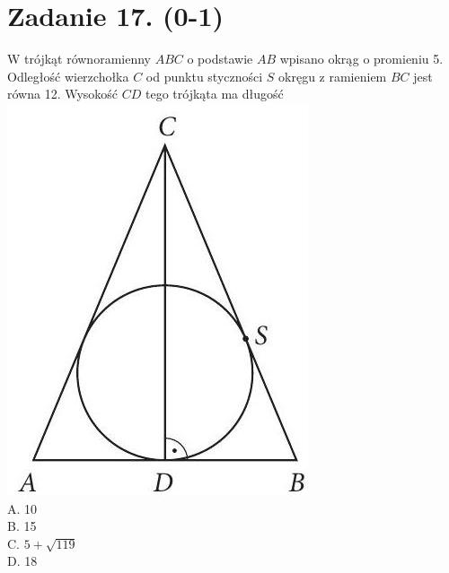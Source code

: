 \documentclass[10pt]{article}
\begin{document}
\section*{Zadanie 17. (0-1)}
W trójkąt równoramienny \(A B C\) o podstawie \(A B\) wpisano okrąg o promieniu 5. Odległość wierzchołka \(C\) od punktu styczności \(S\) okręgu z ramieniem \(B C\) jest równa 12. Wysokość \(C D\) tego trójkąta ma długość\\
\includegraphics[max width=\textwidth, center]{2024_11_21_4a1915d79134dda0750eg-06(1)}\\
A. 10\\
B. 15\\
C. \(5+\sqrt{119}\)\\
D. 18
\end{document}
